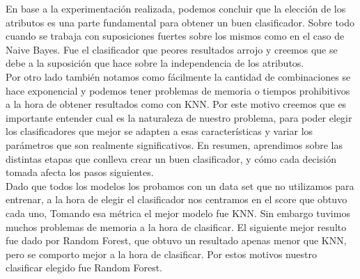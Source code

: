 En base a la experimentación realizada, podemos concluir que la elección de los atributos es una parte fundamental para obtener un buen clasificador. Sobre todo cuando se trabaja con suposiciones fuertes sobre los mismos como en el caso de Naive Bayes. Fue el clasificador que peores resultados arrojo y creemos que se debe a la suposición que hace sobre la independencia de los atributos. \\


Por otro lado también notamos como fácilmente la cantidad de combinaciones se hace exponencial y podemos tener problemas de memoria o tiempos prohibitivos a la hora de obtener resultados como con KNN. Por este motivo creemos que es importante entender cual es la naturaleza de nuestro problema, para poder elegir los clasificadores que mejor se adapten a esas características y variar los parámetros que son realmente significativos. En resumen, aprendimos sobre las distintas etapas que conlleva crear un buen clasificador, y cómo cada decisión tomada afecta los pasos siguientes.\\


Dado que todos los modelos los probamos con un data set que no utilizamos para entrenar, a la hora de elegir el clasificador nos centramos en el score que obtuvo cada uno,  Tomando esa métrica el mejor modelo fue KNN. Sin embargo tuvimos muchos problemas de memoria a la hora de clasificar. El siguiente mejor resulto fue dado por Random Forest, que obtuvo un resultado apenas menor que KNN, pero se comporto mejor a la hora de clasificar. Por estos motivos nuestro clasificar elegido fue Random Forest.\\

